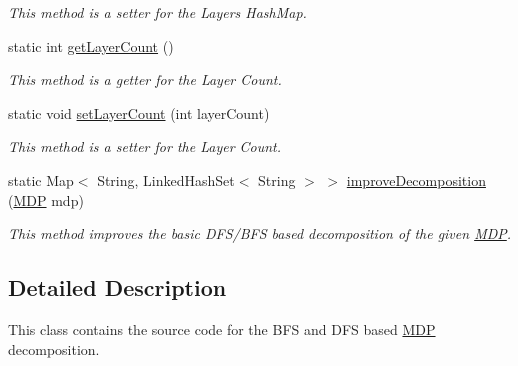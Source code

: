 \begin{DoxyCompactItemize}
\begin{DoxyCompactList}\small\item\em This method is a setter for the Layers Hash\+Map. \end{DoxyCompactList}\item 
\hypertarget{classese_1_1seas_1_1upenn_1_1edu_1_1_planar_separator_a246f23da4501f0ad1219dfdc4e1233cd}{}static int \hyperlink{classese_1_1seas_1_1upenn_1_1edu_1_1_planar_separator_a246f23da4501f0ad1219dfdc4e1233cd}{get\+Layer\+Count} ()\label{classese_1_1seas_1_1upenn_1_1edu_1_1_planar_separator_a246f23da4501f0ad1219dfdc4e1233cd}

\begin{DoxyCompactList}\small\item\em This method is a getter for the Layer Count. \end{DoxyCompactList}\item 
\hypertarget{classese_1_1seas_1_1upenn_1_1edu_1_1_planar_separator_a3916f7362296694f146a4337591fc7df}{}static void \hyperlink{classese_1_1seas_1_1upenn_1_1edu_1_1_planar_separator_a3916f7362296694f146a4337591fc7df}{set\+Layer\+Count} (int layer\+Count)\label{classese_1_1seas_1_1upenn_1_1edu_1_1_planar_separator_a3916f7362296694f146a4337591fc7df}

\begin{DoxyCompactList}\small\item\em This method is a setter for the Layer Count. \end{DoxyCompactList}\item 
static Map$<$ String, Linked\+Hash\+Set$<$ String $>$ $>$ \hyperlink{classese_1_1seas_1_1upenn_1_1edu_1_1_planar_separator_a5ef2580d55968a79d965bcef4d535e03}{improve\+Decomposition} (\hyperlink{classese_1_1seas_1_1upenn_1_1edu_1_1_m_d_p}{M\+D\+P} mdp)
\begin{DoxyCompactList}\small\item\em This method improves the basic D\+F\+S/\+B\+F\+S based decomposition of the given \hyperlink{classese_1_1seas_1_1upenn_1_1edu_1_1_m_d_p}{M\+D\+P}. \end{DoxyCompactList}\end{DoxyCompactItemize}


\subsection{Detailed Description}
This class contains the source code for the B\+F\+S and D\+F\+S based \hyperlink{classese_1_1seas_1_1upenn_1_1edu_1_1_m_d_p}{M\+D\+P} decomposition. 

